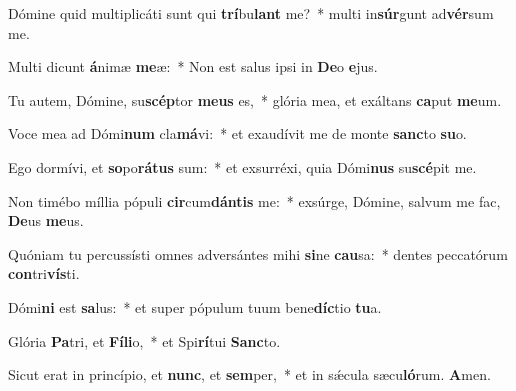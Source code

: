 \item Dómine quid multiplicáti sunt qui \textbf{trí}bu\textbf{lant} me?~* multi in\textbf{súr}gunt ad\textbf{vér}sum me.
\item Multi dicunt \textbf{á}nimæ \textbf{me}æ:~* Non est salus ipsi in \textbf{De}o \textbf{e}jus.
\item Tu autem, Dómine, su\textbf{scép}tor \textbf{me}\textbf{us} es,~* glória mea, et exáltans \textbf{ca}put \textbf{me}um.
\item Voce mea ad Dómi\textbf{num} cla\textbf{má}vi:~* et exaudívit me de monte \textbf{sanc}to \textbf{su}o.
\item Ego dormívi, et \textbf{so}po\textbf{rá}\textbf{tus} sum:~* et exsurréxi, quia Dómi\textbf{nus} su\textbf{scé}pit me.
\item Non timébo míllia pópuli \textbf{cir}cum\textbf{dán}\textbf{tis} me:~* exsúrge, Dómine, salvum me fac, \textbf{De}us \textbf{me}us.
\item Quóniam tu percussísti omnes adversántes mihi \textbf{si}ne \textbf{cau}sa:~* dentes peccatórum \textbf{con}tri\textbf{vís}ti.
\item Dómi\textbf{ni} est \textbf{sa}lus:~* et super pópulum tuum bene\textbf{díc}tio \textbf{tu}a.
\item Glória \textbf{Pa}tri, et \textbf{Fí}\textbf{li}o,~* et Spi\textbf{rí}tui \textbf{Sanc}to.
\item Sicut erat in princípio, et \textbf{nunc}, et \textbf{sem}per,~* et in sǽcula sæcu\textbf{ló}rum. \textbf{A}men.